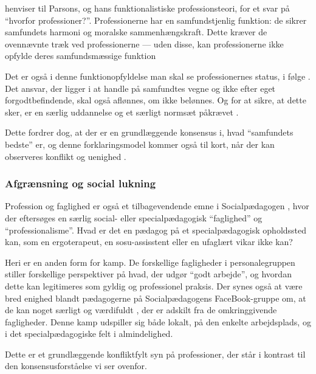 \citeauthor{frederiksenVelfaerdsprofessionerMellemOmsorg2017} henviser til Parsons, og hans funktionalistiske professionsteori, for et svar på “hvorfor professioner?”.
Professionerne har en samfundstjenlig funktion: de sikrer samfundets harmoni og moralske sammenhængskraft.
Dette kræver de ovennævnte træk ved professionerne --- uden disse, kan professionerne ikke opfylde deres samfundsmæssige funktion \autocite[s. 450]{frederiksenVelfaerdsprofessionerMellemOmsorg2017}

Det er også i denne funktionopfyldelse man skal se professionernes status, i følge \citeauthor{frederiksenVelfaerdsprofessionerMellemOmsorg2017}.
Det ansvar, der ligger i at handle på samfundtes vegne og ikke efter eget forgodtbefindende, skal også aflønnes, om ikke belønnes.
Og for at sikre, at dette sker, er en særlig uddannelse og et særligt normsæt påkrævet \autocite[s. 451]{frederiksenVelfaerdsprofessionerMellemOmsorg2017}.

Dette fordrer dog, at der er en grundlæggende konsensus i, hvad “samfundets bedste” er, og denne forklaringsmodel kommer også til kort, når der kan observeres konflikt og uenighed \autocite{frederiksenVelfaerdsprofessionerMellemOmsorg2017}.

\subsubsection{Afgrænsning og social lukning}

Profession og faglighed er også et tilbagevendende emne i Socialpædagogen \autocite[fx]{petersenHvadSigerEksperten2019}, hvor der eftersøges en særlig social- eller specialpædagogisk “faglighed” og “professionalisme”.
Hvad er det en pædagog på et specialpædagogisk opholdssted kan, som en ergoterapeut, en sosu-assisstent eller en ufaglært vikar ikke kan?

Heri er en anden form for kamp.
De forskellige fagligheder i personalegruppen stiller forskellige perspektiver på hvad, der udgør “godt arbejde”, og hvordan dette kan legitimeres som gyldig og professionel praksis.
Der synes også at være bred enighed blandt pædagogerne på Socialpædagogens FaceBook-gruppe om, at de kan noget særligt og værdifuldt \autocite{petersenSlagsMenneskeligAltmuligmand2019}, der er adskilt fra de omkringgivende fagligheder.
Denne kamp udspiller sig både lokalt, på den enkelte arbejdsplads, og i det specialpædagogiske felt i almindelighed.

Dette er et grundlæggende konfliktfylt syn på professioner, der står i kontrast til den konsensusforståelse vi ser ovenfor.

